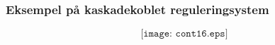 \documentclass{beamer}
\begin{document}


\begin{frame}
	\frametitle{Eksempel på kaskadekoblet reguleringsystem}

	
$$\texttt{[image: cont16.eps]}$$

\end{frame}








\end{document}
